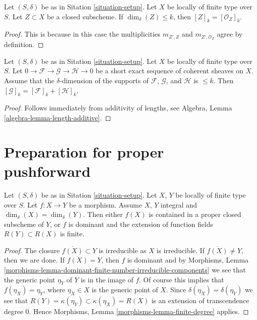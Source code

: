 \begin{lemma}
\label{lemma-cycle-closed-coherent}
Let $(S, \delta)$ be as in Sitation \ref{situation-setup}.
Let $X$ be locally of finite type over $S$.
Let $Z \subset X$ be a closed subscheme.
If $\dim_\delta(Z) \leq k$, then $[Z]_k = [{\mathcal O}_Z]_k$.
\end{lemma}

\begin{proof}
This is because in this case the multiplicities $m_{Z', Z}$ and
$m_{Z', \mathcal{O}_Z}$ agree by definition.
\end{proof}

\begin{lemma}
\label{lemma-additivity-sheaf-cycle}
Let $(S, \delta)$ be as in Sitation \ref{situation-setup}.
Let $X$ be locally of finite type over $S$.
Let $0 \to \mathcal{F} \to \mathcal{G} \to \mathcal{H} \to 0$
be a short exact sequence of coherent sheaves on $X$.
Assume that the $\delta$-dimension of the supports
of $\mathcal{F}$, $\mathcal{G}$, and $\mathcal{H}$ is $\leq k$.
Then $[\mathcal{G}]_k = [\mathcal{F}]_k + [\mathcal{H}]_k$.
\end{lemma}

\begin{proof}
Follows immediately from additivity of lengths, see
Algebra, Lemma \ref{algebra-lemma-length-additive}.
\end{proof}









\section{Preparation for proper pushforward}
\label{section-preparation-pushforward}

\begin{lemma}
\label{lemma-equal-dimension}
Let $(S, \delta)$ be as in Sitation \ref{situation-setup}.
Let $X$, $Y$ be locally of finite type over $S$.
Let $f : X \to Y$ be a morphism.
Assume $X$, $Y$ integral and $\dim_\delta(X) = \dim_\delta(Y)$.
Then either $f(X)$ is contained in a proper closed subscheme
of $Y$, or $f$ is dominant and the extension of function fields
$R(Y) \subset R(X)$ is finite.
\end{lemma}

\begin{proof}
The closure $\overline{f(X)} \subset Y$ is irreducible as $X$
is irreducible. If $\overline{f(X)} \not = Y$, then we are done.
If $\overline{f(X)} = Y$, then $f$ is dominant and by
Morphisms,
Lemma \ref{morphisms-lemma-dominant-finite-number-irreducible-components}
we see that the generic point $\eta_Y$ of $Y$ is in the image of $f$.
Of course this implies that $f(\eta_X) = \eta_Y$, where $\eta_X \in X$
is the generic point of $X$. Since $\delta(\eta_X) = \delta(\eta_Y)$
we see that $R(Y) = \kappa(\eta_Y) \subset \kappa(\eta_X) = R(X)$
is an extension of transcendence degree $0$.
Hence Morphisms, Lemma \ref{morphisms-lemma-finite-degree} applies.
\end{proof}

